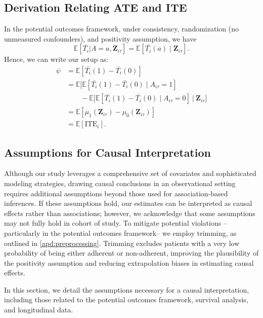 
\subsection{Derivation Relating ATE and ITE}
\label{apd:ate-ite}

In the potential outcomes framework, under consistency, randomization (no unmeasured confounders), and positivity assumption, we have
\[
\mathbb{E}[\bar{T_i}|A=a, \mathbf{Z}_{i\tau}]=\mathbb{E}[\bar{T_i}(a) \mid \mathbf{Z}_{i\tau}].
\]
Hence, we can write our setup as:
\begin{align*}
\psi
    &= \mathbb{E}[\bar{T_i}(1) - \bar{T_i}(0)] \\
    &= \mathbb{E}\big[\mathbb{E}[\bar{T_i}(1) - \bar{T_i}(0) \mid A_{i\tau} = 1]\\
    &\quad \quad- \mathbb{E}[\mathbb{E}[\bar{T_i}(1) - \bar{T_i}(0) \mid A_{i\tau} = 0 ] ~\big|~ \mathbf{Z}_{i\tau}\big] \\
    &=\mathbb{E}[\mu_1(\mathbf{Z}_{i\tau})-\mu_0(\mathbf{Z}_{i\tau})] \\
    &=\mathbb{E}[\text{ITE}_i].
\end{align*}

\subsection{Assumptions for Causal Interpretation}
\label{adp:from_assoc_to_causal}
Although our study leverages a comprehensive set of covariates and sophisticated modeling strategies, drawing causal conclusions in an observational setting requires additional assumptions beyond those used for association-based inferences. 
If these assumptions hold, our estimates can be interpreted as causal effects rather than associations; however, we acknowledge that some assumptions may not fully hold in cohort of study. 
To mitigate potential violations --particularly in the potential outcomes framework-- we employ trimming, as outlined in \ref{apd:preprocessing}. 
Trimming excludes patients with a very low probability of being either adherent or non-adherent, improving the plausibility of the positivity assumption and reducing extrapolation biases in estimating causal effects.

In this section, we detail the assumptions necessary for a causal interpretation, including those related to the potential outcomes framework, survival analysis, and longitudinal data.

